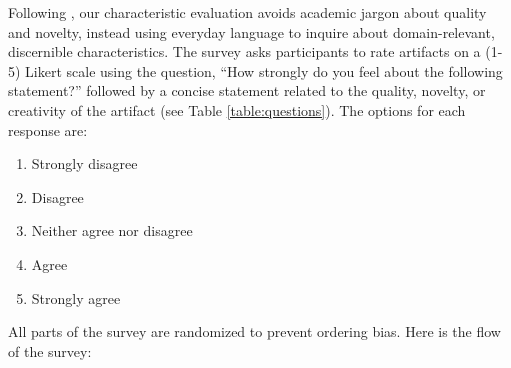 \documentclass[phd,electronic,oneside,twosidetoc,letterpaper,chaptercenter,parttop,lof]{byumsphd}
\begin{document}
Following \citeauthor{morain2023language}, our characteristic evaluation avoids academic jargon about quality and novelty, instead using everyday language to inquire about domain-relevant, discernible characteristics. The survey asks participants to rate artifacts on a (1-5) Likert scale using the question, “How strongly do you feel about the following statement?” followed by a concise statement related to the quality, novelty, or creativity of the artifact (see Table \ref{table:questions}). The options for each response are:

\begin{enumerate}
  \setlength{\itemsep}{1pt}
  \setlength{\parskip}{0pt}
  \setlength{\parsep}{0pt}
    \item Strongly disagree
    \item Disagree
    \item Neither agree nor disagree
    \item Agree
    \item Strongly agree
\end{enumerate}

All parts of the survey are randomized to prevent ordering bias. Here is the flow of the survey:
\end{document}
